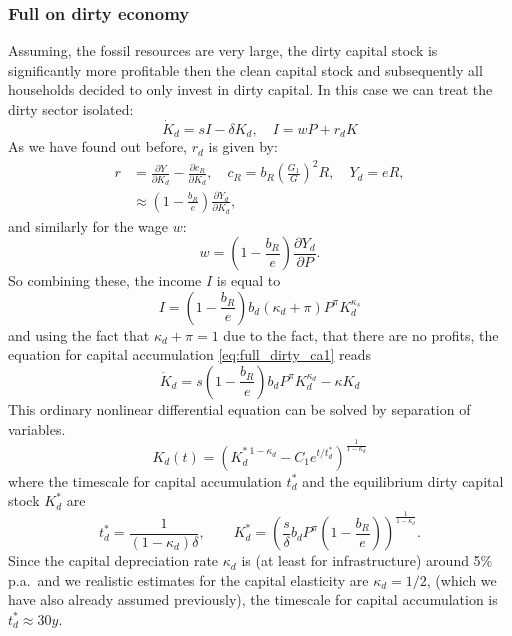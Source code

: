 \subsubsection{Full on dirty economy}
Assuming, the fossil resources are very large, the dirty capital stock is significantly more profitable then the clean capital stock and subsequently all households decided to only invest in dirty capital. In this case we can treat the dirty sector isolated:
\begin{equation}
	\dot{K}_d = s I - \delta K_d, \quad I = w P + r_d K
	\label{eq:full_dirty_ca1}
\end{equation}
As we have found out before, $r_d$ is given by:
\begin{align}
	r &= \frac{\partial Y}{\partial K_d} - \frac{\partial c_R}{\partial K_d}, \quad c_R = b_R\left( \frac{G_1}{G} \right)^{2} R, \quad Y_d = eR, \\
	&\approx \left( 1-\frac{b_R}{e} \right)\frac{\partial Y_d}{\partial K_d},
	\label{eq:full_dirty_capital_rent}
\end{align}
and similarly for the wage $w$:
\begin{equation}
	w = \left( 1-\frac{b_R}{e} \right)\frac{\partial Y_d}{\partial P}.
	\label{eq:full_dirty_wage}
\end{equation}
So combining these, the income $I$ is equal to
\begin{equation}
	I = \left( 1-\frac{b_R}{e} \right)b_d (\kappa_d + \pi) P^{\pi} K_d^{\kappa_s}
	\label{eq_full_dirty_income}
\end{equation}
and using the fact that $\kappa_d + \pi = 1$ due to the fact, that there are no profits, the equation for capital accumulation \eqref{eq:full_dirty_ca1} reads
\begin{equation}
	\dot{K}_d = s\left( 1 - \frac{b_R}{e} \right) b_d P^{\pi} K_d^{\kappa_d} - \kappa K_d
	\label{eq:full_dirty_ca2}
\end{equation}
This ordinary nonlinear differential equation can be solved by separation of variables.
\begin{equation}
	K_d (t) = \left( K_d^{*\ 1-\kappa_d} - C_1 e^{t/t_d^{*}} \right)^{\frac{1}{1-\kappa_d}}
	\label{eq:dirty_capital_ac_solution}
\end{equation}
where the timescale for capital accumulation $t^*_d$ and the equilibrium dirty capital stock $K^*_d$ are
\begin{equation}
	t_d^{*} = \frac{1}{(1-\kappa_d)\delta}, \qquad K_d^{*} = \left( \frac{s}{\delta}b_d P^{\pi}\left(1-\frac{b_R}{e}  \right) \right)^{\frac{1}{1-\kappa_d}}.
	\label{eq:dirty_capital_equilibrium_values}
\end{equation}
Since the capital depreciation rate $\kappa_d$ is (at least for infrastructure) around 5\% p.a.\ and we realistic estimates for the capital elasticity are $\kappa_d=1/2$, (which we have also already assumed previously), the timescale for capital accumulation is $t^*_d \approx 30 y$.

